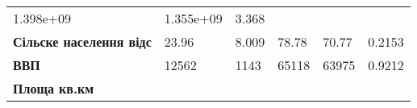 \documentclass[
]{article}
\begin{document}
\begin{longtable}[]{@{}llllll@{}}
\begin{minipage}[t]{0.14\columnwidth}
1.398e+09\strut
\end{minipage} & \begin{minipage}[t]{0.14\columnwidth}\raggedright
1.355e+09\strut
\end{minipage} & \begin{minipage}[t]{0.10\columnwidth}\raggedright
3.368\strut
\end{minipage}\tabularnewline
\begin{minipage}[t]{0.19\columnwidth}\raggedright
\textbf{Сільске населення відс}\strut
\end{minipage} & \begin{minipage}[t]{0.13\columnwidth}\raggedright
23.96\strut
\end{minipage} & \begin{minipage}[t]{0.13\columnwidth}\raggedright
8.009\strut
\end{minipage} & \begin{minipage}[t]{0.14\columnwidth}\raggedright
78.78\strut
\end{minipage} & \begin{minipage}[t]{0.14\columnwidth}\raggedright
70.77\strut
\end{minipage} & \begin{minipage}[t]{0.10\columnwidth}\raggedright
0.2153\strut
\end{minipage}\tabularnewline
\begin{minipage}[t]{0.19\columnwidth}\raggedright
\textbf{ВВП}\strut
\end{minipage} & \begin{minipage}[t]{0.13\columnwidth}\raggedright
12562\strut
\end{minipage} & \begin{minipage}[t]{0.13\columnwidth}\raggedright
1143\strut
\end{minipage} & \begin{minipage}[t]{0.14\columnwidth}\raggedright
65118\strut
\end{minipage} & \begin{minipage}[t]{0.14\columnwidth}\raggedright
63975\strut
\end{minipage} & \begin{minipage}[t]{0.10\columnwidth}\raggedright
0.9212\strut
\end{minipage}\tabularnewline
\begin{minipage}[t]{0.19\columnwidth}\raggedright
\textbf{Площа кв.км}\strut
\end{minipage} & \begin{minipage}[t]{0.13\columnwidth}\raggedright

\end{minipage}
\end{longtable}
\end{document}
